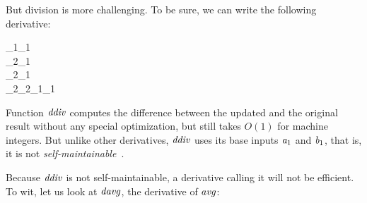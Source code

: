 But division is more challenging. To be sure, we can write the following
derivative:
\begin{hscode}\SaveRestoreHook
{}%
%
%
%
\>[B]{}\;_{1}\;\;_{1}\;\mathrel{=}{}\<[E]%
\\
\>[B]{}\<[3]%
\>[3]{}\;{}\<[8]%
\>[8]{}_{2}\mathrel{=}_{1}\oplus {}\<[E]%
\\
\>[8]{}_{2}\mathrel{=}_{1}\oplus {}\<[E]%
\\
\>[B]{}\<[3]%
\>[3]{}\;{}\<[8]%
\>[8]{}\;_{2}\;_{2}\ominus {}\;_{1}\;_{1}{}\<[E]%
\ColumnHook
\end{hscode}\resethooks
Function \ensuremath{\Varid{ddiv}} computes the difference between the updated and the original
result without any special optimization, but still takes $O(1)$ for machine
integers. But unlike other derivatives, \ensuremath{\Varid{ddiv}} uses its base inputs \ensuremath{\Varid{a}_{1}} and
\ensuremath{\Varid{b}_{1}}, that is, it is not \emph{self-maintainable}~\citep{CaiEtAl2014ILC}.

Because \ensuremath{\Varid{ddiv}} is not self-maintainable, a derivative calling it will not be
efficient. To wit, let us look at \ensuremath{\Varid{davg}}, the derivative of \ensuremath{\Varid{avg}}:

\begin{hscode}\SaveRestoreHook
{}%
%
%
%
%
%
\>[B]{}\;\;\mathrel{=}{}\<[E]%
\\
\>[B]{}\<[3]%
\>[3]{}\;{}\<[8]%
\>[8]{}\<[12]%
\>[12]{}\mathrel{=}{}\<[15]%
\>[15]{}\;\<[E]%
\\
\>[8]{}\<[12]%
\>[12]{}\mathrel{=}\;\;\<[E]%
\\
\>[8]{}\<[12]%
\>[12]{}\mathrel{=}{}\<[15]%
\>[15]{}\;\<[E]%
\\
\>[8]{}\<[12]%
\>[12]{}\mathrel{=}\;\;\<[E]%
\\
\>[8]{}\<[12]%
\>[12]{}\mathrel{=}\;\;\<[E]%
\\
\>[8]{}\<[12]%
\>[12]{}\mathrel{=}\;\;\;\;\<[E]%
\\
\>[B]{}\<[3]%
\>[3]{}\;{}\<[8]%
\>[8]{}\<[E]%
\ColumnHook
\end{hscode}\resethooks

